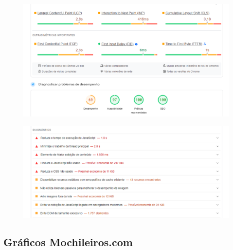 \documentclass{article}
\begin{document}
\begin{figure}[H]
      \centering
      \includegraphics [width=1\textwidth]{IMGDOC/AnaliseTrivago1.png}
      \label{pesq1 tri}
\end{figure}
\begin{figure}[H]
      \centering
      \includegraphics [width=1\textwidth]{IMGDOC/AnaliseTrivago2.png}
      \label{pesq2 tri}
\end{figure}

\subsection{Gráficos Mochileiros.com}
\end{document}
